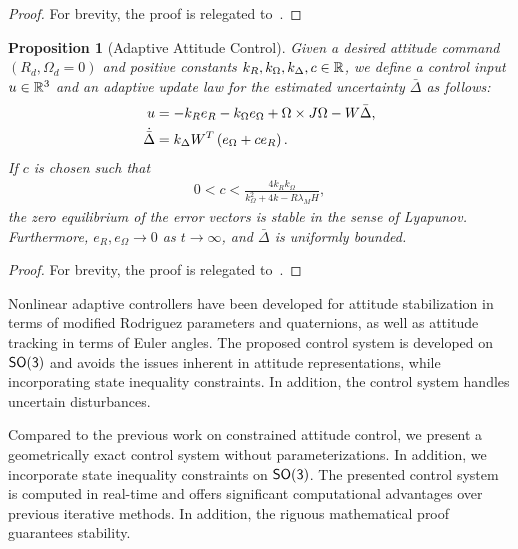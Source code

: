\documentclass[letterpaper, 10 pt, conference]{ieeeconf}  %
\newtheorem{prop}{Proposition}
\begin{document}
\begin{proof}
For brevity, the proof is relegated to~\cite{kulumani2016b}.
\end{proof}
\begin{prop}[Adaptive Attitude Control]\label{prop:adaptive_control}
Given  a desired attitude command \( (R_d, \Omega_d = 0 )\) and positive constants \( k_R, k_\Omega, k_\Delta, c \in \mathbb{R} \), we define a control input \( u \in \mathbb{R}^3\) and an adaptive update law for the estimated uncertainty \( \bar{\Delta} \) as follows:
\begin{align}
	u &= - k_R e_R - k_\Omega e_\Omega + \Omega \times J \Omega - W \bar{\Delta} , \label{eqn:adaptive_control} \\
	\dot{\bar{\Delta}} &= k_\Delta W^T \left( e_\Omega + c e_R \right) . \label{eqn:delta_dot}
\end{align}
If \( c \) is chosen such that
\begin{gather}
	0 < c < \frac{4 k_R k_\Omega}{k_\Omega^2 + 4 k-R \lambda_M H} , \label{eqn:c_bound}
\end{gather}
  the zero equilibrium of the error vectors is stable in the sense of Lyapunov. Furthermore, $e_R,e_\Omega\rightarrow 0$ as $t\rightarrow\infty$, and $\bar\Delta$ is uniformly bounded.
\end{prop}
\begin{proof}
For brevity, the proof is relegated to~\cite{kulumani2016b}.
\end{proof}

Nonlinear adaptive controllers have been developed for attitude stabilization in terms of modified Rodriguez parameters and quaternions, as well as attitude tracking in terms of Euler angles. 
The proposed control system is developed on \(\mathsf{SO(3)}\) and avoids the issues inherent in attitude representations, while incorporating state inequality constraints. 
In addition, the control system handles uncertain disturbances.

Compared to the previous work on constrained attitude control, we present a geometrically exact control system without parameterizations.
In addition, we incorporate state inequality constraints on \( \mathsf{SO(3)} \).
The presented control system is computed in real-time and offers significant computational advantages over previous iterative methods. 
In addition, the riguous mathematical proof guarantees stability.
\end{document}
